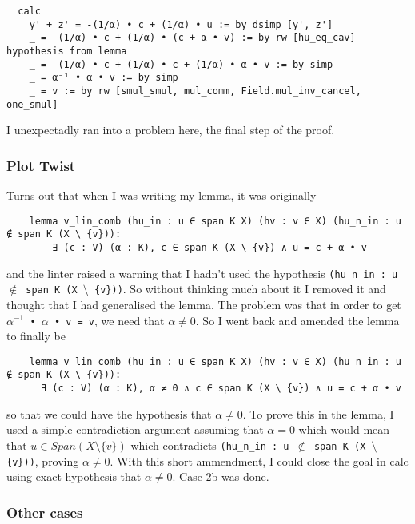 \documentclass{article}
\begin{document}
\begin{lstlisting}
  calc
    y' + z' = -(1/α) • c + (1/α) • u := by dsimp [y', z']
    _ = -(1/α) • c + (1/α) • (c + α • v) := by rw [hu_eq_cav] -- hypothesis from lemma
    _ = -(1/α) • c + (1/α) • c + (1/α) • α • v := by simp
    _ = α⁻¹ • α • v := by simp
    _ = v := by rw [smul_smul, mul_comm, Field.mul_inv_cancel, one_smul]
\end{lstlisting}

I unexpectadly ran into a problem here, the final step of the proof.

\subsubsection{Plot Twist}

Turns out that when I was writing my lemma, it was originally

\begin{lstlisting}
    lemma v_lin_comb (hu_in : u ∈ span K X) (hv : v ∈ X) (hu_n_in : u ∉ span K (X \ {v})):
        ∃ (c : V) (α : K), c ∈ span K (X \ {v}) ∧ u = c + α • v
\end{lstlisting}

and the linter raised a warning that I hadn't used the hypothesis \texttt{(hu\_n\_in : u $\not\in$ span K (X $\setminus$ \{v\}))}. So without thinking much about it I removed it and thought that I had generalised the lemma. The problem was that in order to get \texttt{$\alpha^{-1}$ • $\alpha$ • v = v}, we need that \(\alpha \not= 0\). So I went back and amended the lemma to finally be

\begin{lstlisting}
    lemma v_lin_comb (hu_in : u ∈ span K X) (hv : v ∈ X) (hu_n_in : u ∉ span K (X \ {v})):
      ∃ (c : V) (α : K), α ≠ 0 ∧ c ∈ span K (X \ {v}) ∧ u = c + α • v 
\end{lstlisting}

so that we could have the hypothesis that \(\alpha \not= 0\). To prove this in the lemma, I used a simple contradiction argument assuming that \(\alpha = 0\) which would mean that \(u \in Span(X \setminus \{v\})\) which contradicts \texttt{(hu\_n\_in : u $\not\in$ span K (X $\setminus$ \{v\}))}, proving \(\alpha \not= 0\). With this short ammendment, I could close the goal in calc using exact hypothesis that \(\alpha \not= 0\). Case 2b was done.

\subsubsection{Other cases}
\end{document}
